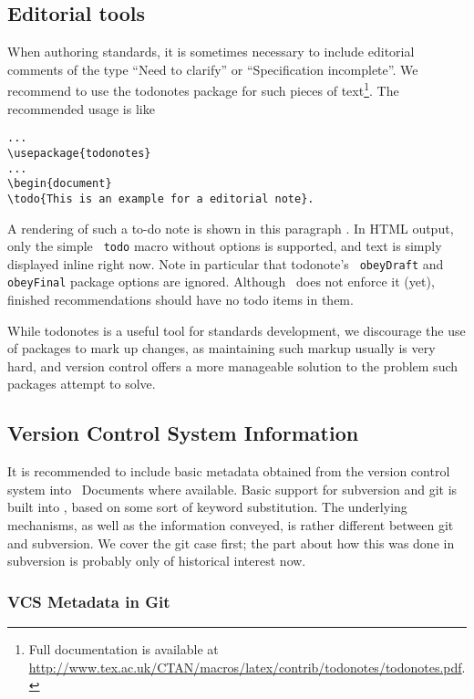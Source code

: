 \documentclass[11pt,a4paper]{ivoa}
\newcommand{\texword}[1]{\texttt{\color{texcolor} #1}}
\begin{document}
\subsection{Editorial tools}

When authoring standards, it is sometimes necessary to include
editorial comments of the type ``Need to clarify'' or ``Specification
incomplete''.  We recommend to use the todonotes package for such
pieces of text\footnote{Full documentation is available at
\url{http://www.tex.ac.uk/CTAN/macros/latex/contrib/todonotes/todonotes.pdf}.}.
The recommended usage is like
\begin{lstlisting}
...
\usepackage{todonotes}
...
\begin{document}
\todo{This is an example for a editorial note}.
\end{lstlisting}

A rendering of such a to-do note is shown in this paragraph
. In HTML output,
only the simple \texword{todo} macro without options is supported, and
text is simply displayed inline right now.  Note in particular that
todonote's \texword{obeyDraft} and \texword{obeyFinal} package options
are ignored.  Although \ivoatex\ does not enforce it (yet), finished
recommendations should have no todo items in them.

While todonotes is a useful tool for standards development, we
discourage the use of packages to mark up changes, as maintaining such
markup usually is very hard, and version control offers a more
manageable solution to the problem such packages attempt to solve.

\subsection{Version Control System Information}
\label{sect:vcs}

It is recommended to include basic metadata obtained from the version
control system into \ivoatex~Documents where available.  Basic support
for subversion and git is built into \ivoatex, based on some sort
of keyword substitution.  The underlying mechanisms, as well as
the information conveyed, is rather different between git and
subversion.  We cover the git case first; the part about how this was
done in subversion is probably only of historical interest now.

\subsubsection{VCS Metadata in Git}
\end{document}

